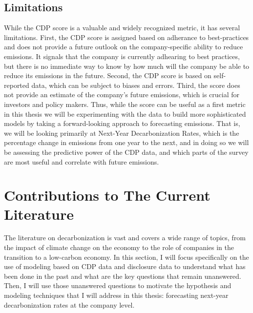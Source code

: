 \subsection{Limitations}


\noindent While the CDP score is a valuable and widely recognized metric, it has several limitations. First, the CDP score is assigned based on adherance to best-practices and does not provide a future outlook on the company-specific ability to reduce emissions. It signals that the company is currently adhearing to best practices, but there is no immediate way to know by how much will the company be able to reduce its emissions in the future. Second, the CDP score is based on self-reported data, which can be subject to biases and errors. Third, the score does not provide an estimate of the company's future emissions, which is crucial for investors and policy makers. Thus, while the score can be useful as a first metric in this thesis we will be experimenting with the data to build more sophisticated models by taking a forward-looking approach to forecasting emissions. That is, we will be looking primarily at Next-Year Decarbonization Rates, which is the percentage change in emissions from one year to the next, and in doing so we will be assessing the predictive power of the CDP data, and which parts of the survey are most useful and correlate with future emissions.



% 

\section{Contributions to The Current Literature}
\noindent The literature on decarbonization is vast and covers a wide range of topics, from the impact of climate change on the economy to the role of companies in the transition to a low-carbon economy. In this section, I will focus specifically on the use of modeling based on CDP data and disclosure data to understand what has been done in the past and what are the key questions that remain unanswered. Then, I will use those unanswered questions to motivate the hypothesis and modeling techniques that I will address in this thesis: forecasting next-year decarbonization rates at the company level.


